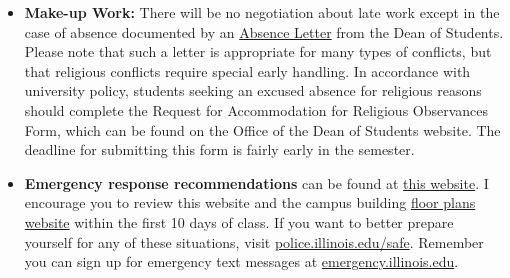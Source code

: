 \documentclass[11pt, a4paper]{article}
\begin{document}
\begin{itemize}
        adjusted for lateness, your grade $G(t)$ is a decaying percentage of 
                the raw grade $G_0$. An assignment turned in $t$ hours late 
                will receive a grade according to the following relation:
\begin{align*}
        G(t) &= G_0e^{-\lambda t}
        \intertext{where}
        G(t) &= \mbox{grade adjusted for lateness}\\
        G_0 &= \mbox{raw grade}\\
        \lambda &= \frac{ln(2)}{t_{\frac{1}{2}}} = \mbox{decay constant} \\
        t &= \mbox{time elapsed since due [hours]}\\
        t_{1/2} &= 1 = \mbox{half-life [hours]} \\
\end{align*}
\item[] \textbf{Make-up Work:} There will be no negotiation about late work 
        except in the case of absence documented by an 
                \href{https://odos.illinois.edu/community-of-care/resources/students/absence-letters/}{Absence Letter}
                from the Dean of Students.  
                Please note that such a letter is appropriate 
                for many types of conflicts, but that religious conflicts 
                require special early handling. In accordance with university 
                policy, students seeking an excused absence for religious 
                reasons should complete the Request for Accommodation for 
                Religious Observances Form, which can be found on the Office of 
                the Dean of Students website. The deadline for submitting this 
                form is fairly early in the semester.
\item[]\textbf{Emergency response recommendations} can be found at
        \href{http://police.illinois.edu/em/planning/emergency-response-guide/}{this website}.
        I encourage you to review this website and the campus building
        \href{http://police.illinois.edu/emergency-preparedness/building-emergency-action-plans/}{floor
        plans website} within the first 10 days of class.  If you want to
        better prepare yourself for any of these situations, visit
        \href{http://police.illinois.edu/safe}{police.illinois.edu/safe}. Remember you can sign up for emergency
        text messages at \href{http://emergency.illinois.edu}{emergency.illinois.edu}.


\end{itemize}
\end{document}
